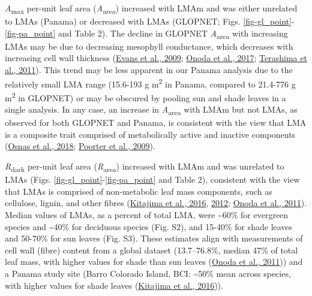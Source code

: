 \documentclass[
  12pt,
  letterpaper,
  DIV=11,
  numbers=noendperiod]{scrartcl}
\begin{document}
\emph{A}\textsubscript{max} per-unit leaf area
(\emph{A}\textsubscript{area}) increased with LMAm and was either
unrelated to LMAs (Panama) or decreased with LMAs (GLOPNET; Figs.
\ref{fig-gl_point}-\ref{fig-pa_point} and Table 2). The decline in
GLOPNET \emph{A}\textsubscript{area} with increasing LMAs may be due to
decreasing mesophyll conductance, which decreases with increasing cell
wall thickness (\protect\hyperlink{ref-Evans2009}{Evans et al., 2009};
\protect\hyperlink{ref-Onoda2017}{Onoda et al., 2017};
\protect\hyperlink{ref-Terashima2011}{Terashima et al., 2011}). This
trend may be less apparent in our Panama analysis due to the relatively
small LMA range (15.6-193 g m\textsuperscript{2} in Panama, compared to
21.4-776 g m\textsuperscript{2} in GLOPNET) or may be obscured by
pooling sun and shade leaves in a single analysis. In any case, an
increase in \emph{A}\textsubscript{area} with LMAm but not LMAs, as
observed for both GLOPNET and Panama, is consistent with the view that
LMA is a composite trait comprised of metabolically active and inactive
components (\protect\hyperlink{ref-Osnas2018}{Osnas et al., 2018};
\protect\hyperlink{ref-Poorter2009}{Poorter et al., 2009}).

\emph{R}\textsubscript{dark} per-unit leaf area
(\emph{R}\textsubscript{area}) increased with LMAm and was unrelated to
LMAs (Figs. \ref{fig-gl_point}-\ref{fig-pa_point} and Table 2),
consistent with the view that LMAs is comprised of non-metabolic leaf
mass components, such as cellulose, lignin, and other fibres
(\protect\hyperlink{ref-Kitajima2016}{Kitajima et al., 2016},
\protect\hyperlink{ref-Kitajima2012}{2012};
\protect\hyperlink{ref-Onoda2011}{Onoda et al., 2011}). Median values of
LMAs, as a percent of total LMA, were \textasciitilde60\% for evergreen
species and \textasciitilde40\% for deciduous species (Fig. S2), and
15-40\% for shade leaves and 50-70\% for sun leaves (Fig. S3). These
estimates align with measurements of cell wall (fibre) content from a
global dataset (13.7--76.8\%, median 47\% of total leaf mass, with
higher values for shade than sun leaves
(\protect\hyperlink{ref-Onoda2011}{Onoda et al., 2011})) and a Panama
study site (Barro Colorado Island, BCI: \textasciitilde50\% mean across
species, with higher values for shade leaves
(\protect\hyperlink{ref-Kitajima2016}{Kitajima et al., 2016})).
\end{document}
